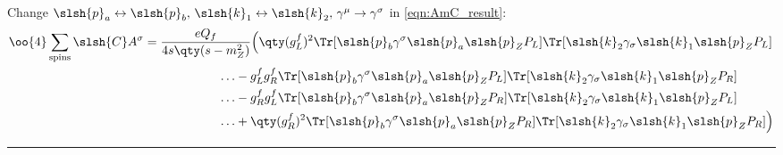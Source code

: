 	Change $\slsh{p}_a\leftrightarrow\slsh{p}_b,\,\slsh{k}_1\leftrightarrow\slsh{k}_2,\, \gamma^\mu\rightarrow\gamma^\sigma$ in \ref{eqn:AmC_result}:
	\begin{align}
		\label{eqn:CAs_result}
		\begin{split}
			\oo{4}\sum_\text{spins}\slsh{C}A^\sigma
			&=\frac{eQ_f}{4s\qty(s-m_Z^2)}
			\Big(
			\qty(g_L^f)^2
			\Tr[\slsh{p}_b\gamma^\sigma\slsh{p}_a\slsh{p}_Z P_L]
			\Tr[\slsh{k}_2\gamma_\sigma\slsh{k}_1\slsh{p}_Z P_L]
			\\
			&\qquad\qquad\qquad\ldots
			-g_L^fg_R^f
			\Tr[\slsh{p}_b\gamma^\sigma\slsh{p}_a\slsh{p}_Z P_L]
			\Tr[\slsh{k}_2\gamma_\sigma\slsh{k}_1\slsh{p}_Z P_R]
			\\
			&\qquad\qquad\qquad\ldots
			-g_R^fg_L^f
			\Tr[\slsh{p}_b\gamma^\sigma\slsh{p}_a\slsh{p}_Z P_R]
			\Tr[\slsh{k}_2\gamma_\sigma\slsh{k}_1\slsh{p}_Z P_L]
			\\
			&\qquad\qquad\qquad\ldots
			+\qty(g_R^f)^2
			\Tr[\slsh{p}_b\gamma^\sigma\slsh{p}_a\slsh{p}_Z P_R]
			\Tr[\slsh{k}_2\gamma_\sigma\slsh{k}_1\slsh{p}_Z P_R]
			\Big)
		\end{split}
	\end{align}
\hrule\newpage

